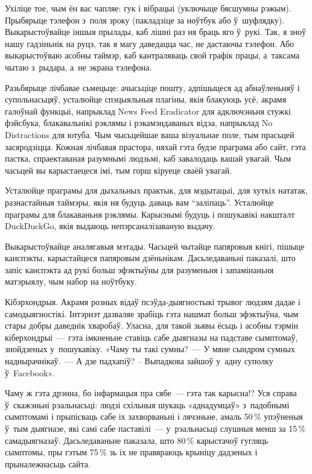 Ухіліце тое, чым ён вас чапляе: гук і вібрацыі (уключыце бясшумны рэжым). Прыбярыце тэлефон з~поля зроку (пакладзіце за ноўтбук або ў~шуфлядку). Выкарыстоўвайце іншыя прылады, каб лішні раз ня браць яго ў~рукі. Так, я зноў нашу гадзіньнік на руцэ, так я магу даведацца час, не дастаючы тэлефон. Або выкарыстоўваю асобны таймэр, каб кантраляваць свой графік працы, а~таксама чытаю з~рыдара, а~не экрана тэлефона.

Разьбярыце лічбавае сьмецьце: ачысьціце пошту, адпішыцеся ад абнаўленьняў і супольнасьцяў, усталюйце спэцыяльныя плагіны, якія блакуюць усё, акрамя галоўнай функцыі, напрыклад News Feed Eradicator для адключэньня стужкі фэйсбука, блакавальнікі рэклямы і рэкамэндаваных відэа, напрыклад No Distractions для ютуба. Чым чысьцейшае ваша візуальнае поле, тым прасьцей засяродзіцца. Кожная лічбавая прастора, няхай гэта будзе праграма або сайт, гэта пастка, спраектаваная разумнымі людзьмі, каб завалодаць вашай увагай. Чым часьцей вы карыстаецеся імі, тым горш кіруеце сваёй увагай.

Усталюйце праграмы для дыхальных практык, для мэдытацыі, для хуткіх нататак, разнастайныя таймэры, якія ня будуць даваць вам ``заліпаць''. Усталюйце праграмы для блакаваньня рэклямы. Карыснымі будуць і пошукавікі накшталт DuckDuckGo, якія выдаюць непэрсаналізаваную выдачу.

Выкарыстоўвайце аналягавыя мэтады. Часьцей чытайце папяровыя кнігі, пішыце канспэкты, карыстайцеся папяровым дзёньнікам. Дасьледаваньні паказалі, што запіс канспэкта ад рукі больш эфэктыўны для разуменьня і запамінаньня матэрыялу, чым набор на ноўтбуку.

Кібэрхондрыя. Акрамя розных відаў псэўда-дыягностыкі трывог людзям дадае і самодыягностікі. Інтэрнэт дазваляе зрабіць гэта нашмат больш эфэктыўна, чым стары добры даведнік хваробаў. Уласна, для такой зьявы ёсьць і асобны тэрмін кіберхондрыі~--- гэта імкненьне ставіць сабе дыягназы на падставе сымптомаў, знойдзеных у~пошукавіку. «Чаму ты такі сумны?~--- У мяне сындром сумных наднырачнікаў.~--- А дзе падхапіў? -- Выпадкова зайшоў у~адну суполку ў~Facebook». 

Чаму ж гэта дрэнна, бо інфармацыя пра сябе~--- гэта так карысна!? Уся справа ў~скажэньні рэальнасьці: людзі схільныя шукаць «аднадумцаў» з~падобнымі сымптомамі і прыпісваць сабе іх захворваньні і лячэньне, амаль 50\,\% упэўненыя ў~тым дыягназе, які самі сабе паставілі~--- у~рэальнасьці слушныя менш за 15\,\% самадыягназаў. Дасьледаваньне паказала, што 80\,\% карыстачоў гугляць сымптомы, пры гэтым 75\,\% зь іх не правяраюць крыніцу дадзеных і прыналежнасьць сайта.


